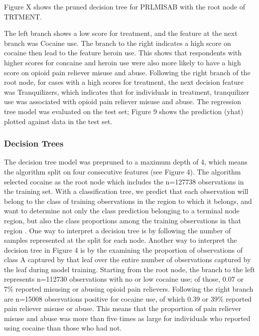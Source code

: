 \documentclass[sigconf]{acmart}
\begin{document}

Figure X shows the 
pruned decision tree for PRLMISAB with the root node of TRTMENT. 

The left branch shows a low score for treatment, and the feature at the next 
branch was Cocaine use. 
The branch to the right indicates a high score on cocaine then lead to 
the feature heroin use. This shows that respondents with higher scores for 
concaine and heroin use were also more likely to have a high score on 
opioid pain reliever misuse and abuse. Following the right branch of the 
root node, for cases with a high scores for treatment, the next decision 
feature was Tranquilizers, which indicates that for individuals in treatment, 
tranquilizer use was associated with opioid pain reliever misuse and abuse. 
The regression tree model was evaluated on the test set; Figure 9 shows 
the prediction (yhat) plotted against data in the test set.

\subsubsection{Decision Trees} 

The decision tree model was prepruned to a maximum depth of 4, which means 
the algorithm split on four consecutive features (see Figure 4). The  
algorithm selected cocaine as the root node which includes the n=127738 
observations in the training set. With a classification tree, we predict 
that each observation will belong to the class of training observations in 
the region to which it belongs, and want to determine not only the class
prediction belonging to a terminal node region, but also the class 
proportions among the training observations in that region \cite{james13}. 
One way to interpret a decision tree is by following the number of samples 
represented at the split for each node. Another way to interpret the decision 
tree in Figure 4 is by the examining the proportion of observations of 
class A captured by that leaf over the entire number of observations captured 
by the leaf during model training. Starting from the root node, the branch 
to the left represents n=112730 observations with no or low cocaine use; 
of those, 0.07 or 7\% reported misusing or abusing opioid pain relievers. 
Following the right branch are n=15008 observations positive for cocaine use, 
of which 0.39 or 39\% reported pain reliever misuse or abuse. This means that 
the proportion of pain reliever misuse and abuse was more than five times as 
large for individuals who reported using cocaine than those who had not. 
\end{document}
